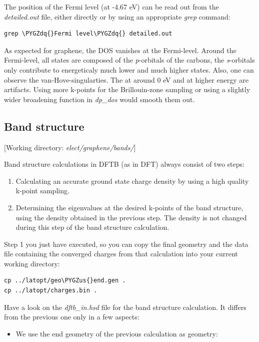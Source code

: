 \documentclass[a4paper,11pt,english]{sphinxmanual}
\def\PYGZus{\char`\_}
\def\PYGZdq{\char`\"}
\begin{document}
{{The position of the Fermi level (at -4.67 eV) can be read out from the
\emph{detailed.out} file, either directly or by using an appropriate \emph{grep}
command:

\begin{Verbatim}[commandchars=\\\{\}]
grep \PYGZdq{}Fermi level\PYGZdq{} detailed.out
\end{Verbatim}

As expected for graphene, the DOS vanishes at the Fermi-level. Around
the Fermi-level, all states are composed of the \emph{p}-orbitals of the
carbons, the \emph{s}-orbitals only contribute to energeticaly much lower
and much higher states. Also, one can observe the
van-Hove-singularties. The  at around 0 eV and at higher
energy are artifacts. Using more k-points for the Brillouin-zone
sampling or using a slightly wider broadening function in \emph{dp\_dos}
would smooth them out.


\subsection{Band structure}
\label{electstruct:band-structure}
{[}Working directory: \emph{elect/graphene/bands/}{]}

Band structure calculations in DFTB (as in DFT) always consist of two
steps:
\begin{enumerate}
\item {} 
Calculating an accurate ground state charge density by using a high
quality k-point sampling.

\item {} 
Determining the eigenvalues at the desired k-points of the band
structure, using the density obtained in the previous step. The
density is not changed during this step of the band structure
calculation.

\end{enumerate}

Step 1 you just have executed, so you can copy the final geometry and the data
file containing the converged charges from that calculation into your current
working directory:

\begin{Verbatim}[commandchars=\\\{\}]
cp ../latopt/geo\PYGZus{}end.gen .
cp ../latopt/charges.bin .
\end{Verbatim}

Have a look on the \emph{dftb\_in.hsd} file for the band structure
calculation. It differs from the previous one only in a few aspects:
\begin{itemize}
\item {} 
We use the end geometry of the previous calculation as geometry:


\end{itemize}}}
\end{document}
